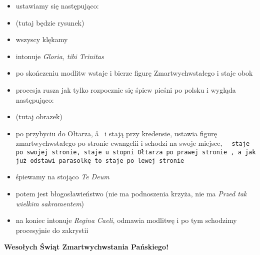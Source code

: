	\begin{itemize}
		\item ustawiamy się następująco:
		\item (tutaj będzie rysunek)
		\item wszyscy klękamy
		\item \ii intonuje \textit{Gloria, tibi Trinitas}
		\item po skończeniu modlitw  wstaje i bierze figurę Zmartwychwstałego i staje obok 
		\item procesja rusza jak tylko rozpocznie się śpiew pieśni po polsku i wygląda następująco:
		\item (tutaj obrazek)
		\item po przybyciu do Ołtarza, \aa~ i  stają przy kredensie,  ustawia figurę zmartwychwstałego po stronie ewangelii i schodzi na swoje miejsce, \tt~ staje po swojej stronie,  staje u stopni Ołtarza po prawej stronie \ii, a  jak już odstawi parasolkę to staje po lewej stronie \ii
		\item śpiewamy na stojąco \textit{Te Deum}
		\item potem jest błogosławieństwo (nie ma podnoszenia krzyża, nie ma
		\textit{Przed tak wielkim sakramentem})
		\item na koniec \ii intonuje \textit{Regina Caeli}, odmawia modlitwę i po
		tym schodzimy procesyjnie do zakrystii
	\end{itemize}

	\bigskip

	\begin{center}
		\Large
		\textbf{Wesołych Świąt Zmartwychwstania Pańskiego!}
	\end{center}
	










	